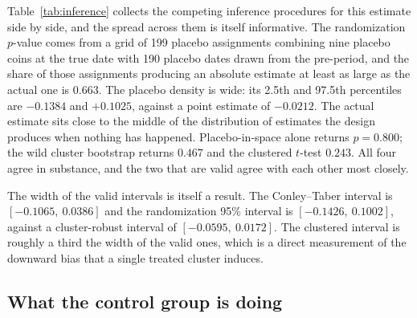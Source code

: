 \documentclass[12pt,a4paper]{article}
\begin{document}
Table~\ref{tab:inference} collects the competing inference procedures for this estimate side by side, and the spread across them is itself informative. The randomization $p$-value comes from a grid of
199 placebo assignments combining nine placebo coins at the true date with
190 placebo dates drawn from the pre-period, and the share of those assignments producing an absolute estimate at least as large as the actual one is
$0.663$. The placebo density is wide: its 2.5th and 97.5th percentiles are
$-0.1384$ and $+0.1025$, against a point estimate of $-0.0212$. The actual estimate sits close to the middle of the distribution of estimates the design produces when nothing has happened. Placebo-in-space alone returns
$p = 0.800$; the wild cluster bootstrap returns
$0.467$ and the clustered $t$-test
$0.243$. All four agree in substance, and the two that are valid agree with each other most closely.

The width of the valid intervals is itself a result. The Conley--Taber interval is
$[-0.1065,\ 0.0386]$ and the randomization 95\% interval is
$[-0.1426,\ 0.1002]$, against a cluster-robust interval of
$[-0.0595,\ 0.0172]$. The clustered interval is roughly a third the width of the valid ones, which is a direct measurement of the downward bias that a single treated cluster induces.



\subsection{What the control group is doing}
\end{document}
